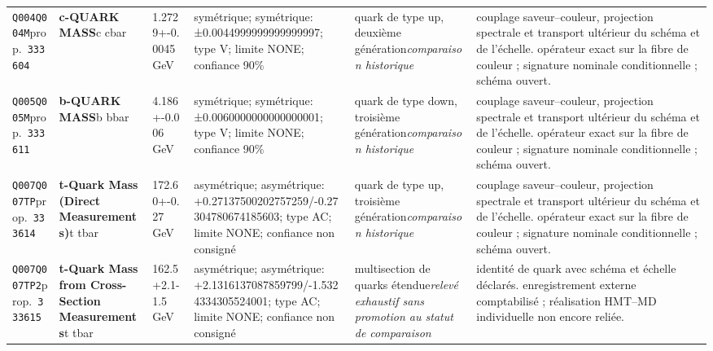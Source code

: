 \begin{landscape}
\begin{longtable}{L{1.85cm}L{4.45cm}L{2.35cm}L{4.05cm}L{3.35cm}L{7.15cm}}
\texttt{Q004}\newline \texttt{Q004M}\newline prop.\ \texttt{333604} & \textbf{c-QUARK MASS}\newline c \textbar{}\allowbreak{} cbar & 1.2729+-0.0045\,GeV & symétrique; symétrique: ±0.0044999999999999997; type V; limite NONE; confiance 90\% & quark de type up, deuxième génération\newline \emph{comparaison historique} & couplage saveur--couleur, projection spectrale et transport ultérieur du schéma et de l'échelle. opérateur exact sur la fibre de couleur ; signature nominale conditionnelle ; schéma ouvert. \\
\texttt{Q005}\newline \texttt{Q005M}\newline prop.\ \texttt{333611} & \textbf{b-QUARK MASS}\newline b \textbar{}\allowbreak{} bbar & 4.186+-0.006\,GeV & symétrique; symétrique: ±0.0060000000000000001; type V; limite NONE; confiance 90\% & quark de type down, troisième génération\newline \emph{comparaison historique} & couplage saveur--couleur, projection spectrale et transport ultérieur du schéma et de l'échelle. opérateur exact sur la fibre de couleur ; signature nominale conditionnelle ; schéma ouvert. \\
\texttt{Q007}\newline \texttt{Q007TP}\newline prop.\ \texttt{333614} & \textbf{t-Quark Mass (Direct Measurements)}\newline t \textbar{}\allowbreak{} tbar & 172.60+-0.27\,GeV & asymétrique; asymétrique: +0.27137500202757259/-0.27304780674185603; type AC; limite NONE; confiance non consigné & quark de type up, troisième génération\newline \emph{comparaison historique} & couplage saveur--couleur, projection spectrale et transport ultérieur du schéma et de l'échelle. opérateur exact sur la fibre de couleur ; signature nominale conditionnelle ; schéma ouvert. \\
\texttt{Q007}\newline \texttt{Q007TP2}\newline prop.\ \texttt{333615} & \textbf{t-Quark Mass from Cross-Section Measurements}\newline t \textbar{}\allowbreak{} tbar & 162.5+2.1-1.5\,GeV & asymétrique; asymétrique: +2.1316137087859799/-1.5324334305524001; type AC; limite NONE; confiance non consigné & multisection de quarks étendue\newline \emph{relevé exhaustif sans promotion au statut de comparaison} & identité de quark avec schéma et échelle déclarés. enregistrement externe comptabilisé ; réalisation HMT--MD individuelle non encore reliée. \\

\end{longtable}
\end{landscape}
